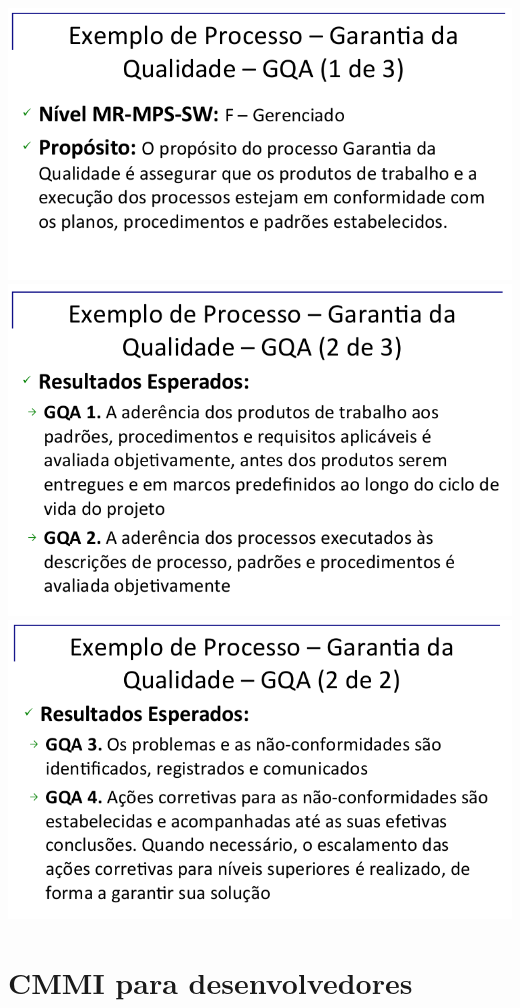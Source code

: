 \documentclass{article}
\begin{document}
\includegraphics[scale=0.30]{exemplo_garantia_qualidade_1}
\includegraphics[scale=0.30]{exemplo_garantia_qualidade_2}
\includegraphics[scale=0.30]{exemplo_garantia_qualidade_3}


\section{CMMI para desenvolvedores} \date{2 de Abril de 2014}
\end{document}
